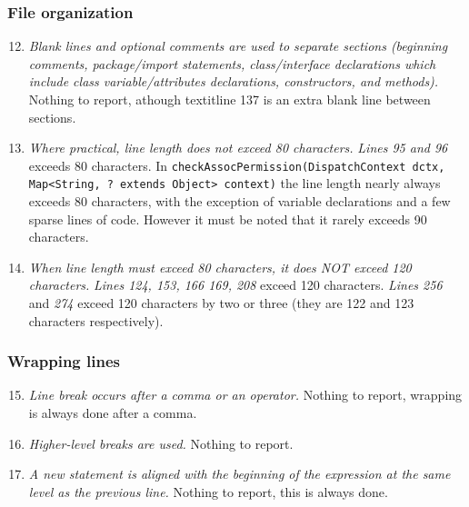 	\subsubsection{File organization}
		\begin{enumerate}
			\setcounter{enumi}{11}
			\item \textit{Blank lines and optional comments are used to separate sections (beginning comments, package/import statements, class/interface declarations which include class variable/attributes declarations, constructors, and methods).}\newline
			Nothing to report, athough textit{line 137} is an extra blank line between sections. %

			\item \textit{Where practical, line length does not exceed 80 characters.}\newline
			\textit{Lines 95 and 96} exceeds 80 characters. 
			In \texttt{checkAssocPermission(DispatchContext dctx, Map<String, ? extends Object> context)} the line length nearly always exceeds 80 characters, with the exception of variable declarations and a few sparse lines of code. However it must be noted that it rarely exceeds 90 characters.

			\item \textit{When line length must exceed 80 characters, it does NOT exceed 120 characters.}\newline
			\textit{Lines 124, 153, 166 169, 208} exceed 120 characters.
			\textit{Lines 256} and \textit{274} exceed 120 characters by two or three (they are 122 and 123 characters respectively). 

		\end{enumerate}

	\subsubsection{Wrapping lines}
		\begin{enumerate}
			\setcounter{enumi}{14}
			\item \textit{Line break occurs after a comma or an operator.}\newline
			Nothing to report, wrapping is always done after a comma. %

			\item \textit{Higher-level breaks are used.}\newline
			Nothing to report. %

			\item \textit{A new statement is aligned with the beginning of the expression at the same level as the previous line.}\newline
			Nothing to report, this is always done. %

		\end{enumerate}

